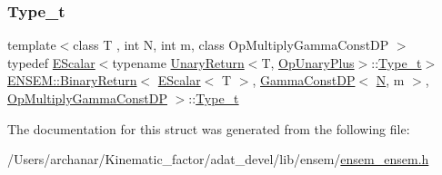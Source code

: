 \subsubsection{\texorpdfstring{Type\_t}{Type\_t}\hspace{0.1cm}{\footnotesize\ttfamily [2/2]}}
{\footnotesize\ttfamily template$<$class T , int N, int m, class Op\+Multiply\+Gamma\+Const\+DP $>$ \\
typedef \mbox{\hyperlink{classENSEM_1_1EScalar}{E\+Scalar}}$<$typename \mbox{\hyperlink{structENSEM_1_1UnaryReturn}{Unary\+Return}}$<$T, \mbox{\hyperlink{structENSEM_1_1OpUnaryPlus}{Op\+Unary\+Plus}}$>$\+::\mbox{\hyperlink{structENSEM_1_1BinaryReturn_3_01EScalar_3_01T_01_4_00_01GammaConstDP_3_01N_00_01m_01_4_00_01OpMultiplyGammaConstDP_01_4_a47d78ff4c81dc5878b6f5df3cf5aa0a1}{Type\+\_\+t}}$>$ \mbox{\hyperlink{structENSEM_1_1BinaryReturn}{E\+N\+S\+E\+M\+::\+Binary\+Return}}$<$ \mbox{\hyperlink{classENSEM_1_1EScalar}{E\+Scalar}}$<$ T $>$, \mbox{\hyperlink{classENSEM_1_1GammaConstDP}{Gamma\+Const\+DP}}$<$ \mbox{\hyperlink{operator__name__util_8cc_a7722c8ecbb62d99aee7ce68b1752f337}{N}}, m $>$, \mbox{\hyperlink{structENSEM_1_1OpMultiplyGammaConstDP}{Op\+Multiply\+Gamma\+Const\+DP}} $>$\+::\mbox{\hyperlink{structENSEM_1_1BinaryReturn_3_01EScalar_3_01T_01_4_00_01GammaConstDP_3_01N_00_01m_01_4_00_01OpMultiplyGammaConstDP_01_4_a47d78ff4c81dc5878b6f5df3cf5aa0a1}{Type\+\_\+t}}}



The documentation for this struct was generated from the following file\+:\begin{DoxyCompactItemize}
\item 
/\+Users/archanar/\+Kinematic\+\_\+factor/adat\+\_\+devel/lib/ensem/\mbox{\hyperlink{lib_2ensem_2ensem__ensem_8h}{ensem\+\_\+ensem.\+h}}\end{DoxyCompactItemize}
